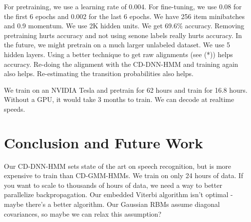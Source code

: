 \documentclass[a4paper]{article}
\begin{document}
For pretraining, we use a learning rate of 0.004. For fine-tuning, we use
0.08 for the first 6 epochs and 0.002 for the last 6 epochs. We have 256 item
minibatches and 0.9 momentum. We use 2K hidden units. We get 69.6\% accuracy.
Removing pretraining hurts accuracy and not using senone labels really hurts
accuracy. In the future, we might pretrain on a much larger unlabeled dataset.
We use 5 hidden layers. Using a better technique to get raw alignments (see 
(*)) helps accuracy. Re-doing the alignment with the CD-DNN-HMM and training
again also helps. Re-estimating the transition probabilities also helps.

We train on an NVIDIA Tesla and pretrain for 62 hours and train for 16.8 hours.
Without a GPU, it would take 3 months to train. We can decode at realtime
speeds.

\section{Conclusion and Future Work}
Our CD-DNN-HMM sets state of the art on speech recognition, but is more
expensive to train than CD-GMM-HMMs. We train on only 24 hours of data. If you
want to scale to thousands of hours of data, we need a way to better
parallelize backpropagation. Our embedded Viterbi algorithm isn't optimal
- maybe there's a better algorithm. Our Gaussian RBMs assume diagonal 
covariances, so maybe we can relax this assumption?
\end{document}
